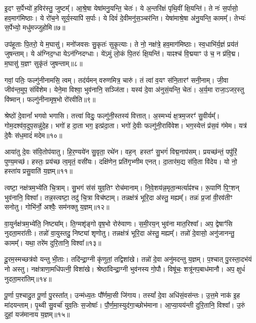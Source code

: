 इ॒दꣳ स॒र्पेभ्यो॑ ह॒विर॑स्तु॒ जुष्टम्᳚। 
आ॒श्रे॒षा येषा॑मनु॒यन्ति॒ चेतः॑। 
ये अ॒न्तरि॑क्षं पृथि॒वीं क्षि॒यन्ति॑। 
ते नः॑ स॒र्पासो॒ हव॒माग॑मिष्ठाः। 
ये रो॑च॒ने सूर्य॒स्यापि॑ स॒र्पाः। 
ये दिवं॑ दे॒वीमनु॑स॒ञ्चर॑न्ति। 
येषा॑माश्रे॒षा अ॑नु॒यन्ति॒ कामम्᳚। 
तेभ्यः॑ स॒र्पेभ्यो॒ मधु॑मज्जुहोमि॥७॥ 

उप॑हूताः पि॒तरो॒ ये म॒घासु॑। 
मनो॑जवसः सु॒कृतः॑ सुकृ॒त्याः। 
ते नो॒ नक्ष॑त्रे॒ हव॒माग॑मिष्ठाः। 
स्व॒धाभि॑र्य॒ज्ञं प्रय॑तं जुषन्ताम्। 
ये अ॑ग्निद॒ग्धा येऽन॑ग्निदग्धाः। 
ये॑ऽमुं लो॒कं पि॒तरः॑ क्षि॒यन्ति॑। 
याꣴश्च॑ वि॒द्मयाꣳ उ॑ च॒ न प्र॑वि॒द्म। 
म॒घासु॑ य॒ज्ञꣳ सुकृ॑तं जुषन्ताम्॥८॥ 

गवां॒ पतिः॒ फल्गु॑नीनामसि॒ त्वम्। 
तद॑र्यमन् वरुणमित्र॒ चारु॑। 
तं त्वा॑ व॒यꣳ स॑नि॒तारꣳ॑ सनी॒नाम्। 
जी॒वा जीव॑न्त॒मुप॒ संवि॑शेम। 
येने॒मा विश्वा॒ भुव॑नानि॒ सञ्जि॑ता। 
यस्य॑ दे॒वा अ॑नुसं॒यन्ति॒ चेतः॑। 
अ॒र्य॒मा राजा॒ऽजर॒स्तु वि॑ष्मान्। 
फल्गु॑नीनामृष॒भो रो॑रवीति॥९॥ 

श्रेष्ठो॑ दे॒वानां᳚ भगवो भगासि। 
तत्त्वा॑ विदुः॒ फल्गु॑नी॒स्तस्य॑ वित्तात्। 
अ॒स्मभ्यं॑ क्ष॒त्रम॒जरꣳ॑ सु॒वीर्यम्᳚। 
गोम॒दश्व॑व॒दुप॒सन्नु॑\-दे॒ह। 
भगो॑ ह दा॒ता भग॒ इत्प्र॑दा॒ता। 
भगो॑ दे॒वीः फल्गु॑नी॒रावि॑वेश। 
भग॒स्येत्तं प्र॑स॒वं ग॑मेम। 
यत्र॑ दे॒वैः स॑ध॒मादं॑ मदेम॥१०॥ 

आया॑तु दे॒वः स॑वि॒तोप॑यातु। 
हि॒र॒ण्यये॑न सु॒वृता॒ रथे॑न। 
वह॒न् हस्तꣳ॑ सु॒भगं॑ विद्म॒नाप॑सम्। 
प्रयच्छ॑न्तं॒ पपु॑रिं॒ पुण्य॒मच्छ॑। 
हस्तः॒ प्रय॑च्छ त्व॒मृतं॒ वसी॑यः। 
दक्षि॑णेन॒ प्रति॑गृभ्णीम एनत्। 
दा॒तार॑म॒द्य स॑वि॒ता वि॑देय। 
यो नो॒ हस्ता॑य प्रसु॒वाति॑ य॒ज्ञम्॥११॥ 

त्वष्टा॒ नक्ष॑त्रम॒भ्ये॑ति चि॒त्राम्। 
सु॒भगं स॑सं युव॒तिꣳ रोच॑मानाम्। 
नि॒वे॒शय॑न्न॒\-मृता॒न्मर्त्याꣴ॑श्च। 
रू॒पाणि॑ पि॒ꣳ॒शन् भुव॑नानि॒ विश्वा᳚। 
तन्न॒स्त्वष्टा॒ तदु॑ चि॒त्रा विच॑ष्टाम्। 
तन्नक्ष॑त्रं भूरि॒दा अ॑स्तु॒ मह्यम्᳚। 
तन्नः॑ प्र॒जां वी॒रव॑तीꣳ सनोतु। 
गोभि॑र्नो॒ अश्वैः॒ सम॑नक्तु य॒ज्ञम्॥१२॥ 

वा॒युर्नक्ष॑त्रम॒भ्ये॑ति॒ निष्ट्या᳚म्। 
ति॒ग्मशृ॑ङ्गो वृष॒भो रोरु॑वाणः। 
स॒मी॒रय॒न् भुव॑ना मात॒रिश्वा᳚। 
अप॒ द्वेषाꣳ॑सि नुदता॒मरा॑तीः। 
तन्नो॑ वा॒युस्तदु॒ निष्ट्या॑ शृणोतु। 
तन्नक्ष॑त्रं भूरि॒दा अ॑स्तु॒ मह्यम्᳚। 
तन्नो॑ दे॒वासो॒ अनु॑जानन्तु॒ कामम्᳚। 
यथा॒ तरे॑म दुरि॒तानि॒ विश्वा᳚॥१३॥ 

दू॒रम॒स्मच्छत्र॑वो यन्तु भी॒ताः। 
तदि॑न्द्रा॒ग्नी कृ॑णुतां॒ तद्विशा॑खे। 
तन्नो॑ दे॒वा अनु॑मदन्तु य॒ज्ञम्। 
प॒श्चात् पु॒रस्ता॒दभ॑यं नो अस्तु। 
नक्ष॑त्राणा॒मधि॑पत्नी॒ विशा॑खे। 
श्रेष्ठा॑विन्द्रा॒ग्नी भुव॑नस्य गो॒पौ। 
विषू॑चः॒ शत्रू॑नप॒बाध॑मानौ। 
अप॒ क्षुधं॑ नुदता॒मरा॑तिम्॥१४॥ 

पू॒र्णा प॒श्चादु॒त पू॒र्णा पु॒रस्ता᳚त्। 
उन्म॑ध्य॒तः पौ᳚र्णमा॒सी जि॑गाय। 
तस्यां᳚ दे॒वा अधि॑सं॒वस॑न्तः। 
उ॒त्त॒मे नाक॑ इ॒ह मा॑दयन्ताम्। 
पृ॒थ्वी सु॒वर्चा॑ युव॒तिः स॒जोषाः᳚। 
पौ॒र्ण॒मा॒स्युद॑गा॒च्छोभ॑माना। 
आ॒प्या॒यय॑न्ती दुरि॒तानि॒ विश्वा᳚। 
उ॒रुं दुहां॒ यज॑मानाय य॒ज्ञम्॥१५॥ 

